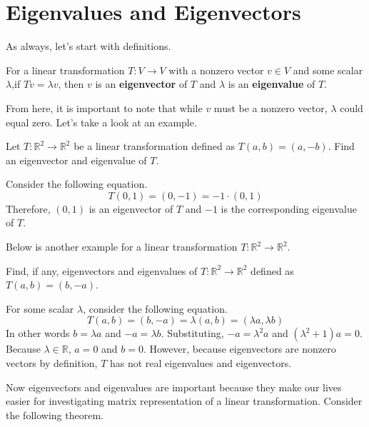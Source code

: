 \documentclass[../../../main.tex]{subfiles}
\begin{document}
\section{Eigenvalues and Eigenvectors}

As always, let's start with definitions.

\begin{definition}{}{}
For a linear transformation $T: V \to V$ with a nonzero vector
$v \in V$ and some scalar $\lambda$,if $Tv = \lambda v$, then
$v$ is an \textbf{eigenvector} of $T$ and $\lambda$ is an
\textbf{eigenvalue} of $T$.
\end{definition}

From here, it is important to note that while $v$ must be a
nonzero vector, $\lambda$ could equal zero. Let's take a look
at an example.

\begin{problem}{}{}
Let $T: \mathbb{R}^2 \to \mathbb{R}^2$ be a linear transformation
defined as $T(a, b) = (a, - b)$. Find an eigenvector and eigenvalue
of $T$.
\end{problem}
\begin{solution}
Consider the following equation.
\[
T(0, 1) = (0, -1) = -1 \cdot (0, 1)
\]
Therefore, $(0, 1)$ is an eigenvector of $T$ and $-1$ is the
corresponding eigenvalue of $T$.
\end{solution}

Below is another example for a linear transformation $T: \mathbb{R}^2
\to \mathbb{R}^2$.

\begin{problem}{}{}
Find, if any, eigenvectors and eigenvalues of $T: \mathbb{R}^2 \to
\mathbb{R}^2$ defined as $T(a, b) = (b, -a)$.
\end{problem}
\begin{solution}
For some scalar $\lambda$, consider the following equation.
\[
T(a, b) = (b, -a) = \lambda (a, b) = (\lambda a, \lambda b)
\]
In other words $b = \lambda a$ and $-a = \lambda b$. Substituting,
$-a = \lambda^2 a$ and $(\lambda^2 + 1) a = 0$. Because $\lambda \in
\mathbb{R}$, $a = 0$ and $b = 0$. However, because eigenvectors
are nonzero vectors by definition, $T$ has not real eigenvalues
and eigenvectors.
\end{solution}

Now eigenvectors and eigenvalues are important because they make
our lives easier for investigating matrix representation of a
linear transformation. Consider the following theorem.
\end{document}

